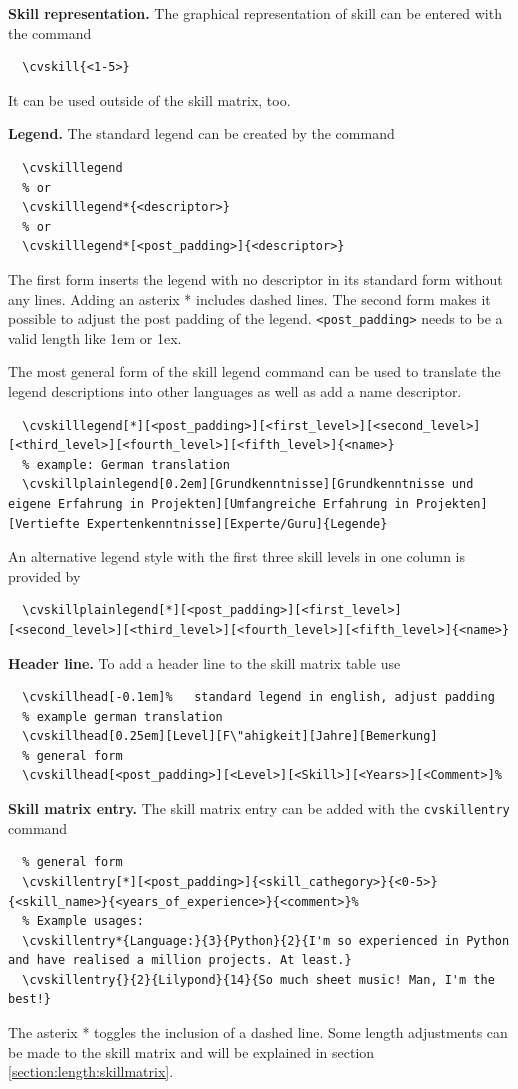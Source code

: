 \documentclass[a4paper,11pt]{article}
\newcommand{\code}[1]{\lstinline!#1!}
\begin{document}
{\bfseries Skill representation. } The graphical representation of skill can be entered with the command
\begin{lstlisting}
  \cvskill{<1-5>}
\end{lstlisting}
It can be used outside of the skill matrix, too. \medskip


{\bfseries Legend. } The standard legend can be created by the command
\begin{lstlisting}
  \cvskilllegend
  % or
  \cvskilllegend*{<descriptor>}
  % or
  \cvskilllegend*[<post_padding>]{<descriptor>}
\end{lstlisting}
The first form inserts the legend with no descriptor in its standard form without any lines.
Adding an asterix * includes dashed lines.
The second form makes it possible to adjust the post padding of the legend. \code{<post_padding>} needs to be a valid length like 1em or 1ex.

The most general form of the skill legend command can be used to translate the legend descriptions into other languages as well as add a name descriptor.

\begin{lstlisting}
  \cvskilllegend[*][<post_padding>][<first_level>][<second_level>][<third_level>][<fourth_level>][<fifth_level>]{<name>}
  % example: German translation
  \cvskillplainlegend[0.2em][Grundkenntnisse][Grundkenntnisse und eigene Erfahrung in Projekten][Umfangreiche Erfahrung in Projekten][Vertiefte Expertenkenntnisse][Experte/Guru]{Legende}
\end{lstlisting}

An alternative legend style with the first three skill levels in one column is provided by
\begin{lstlisting}
  \cvskillplainlegend[*][<post_padding>][<first_level>][<second_level>][<third_level>][<fourth_level>][<fifth_level>]{<name>}
\end{lstlisting} \medskip

{\bfseries Header line. } To add a header line to the skill matrix table use
\begin{lstlisting}
  \cvskillhead[-0.1em]%   standard legend in english, adjust padding
  % example german translation
  \cvskillhead[0.25em][Level][F\"ahigkeit][Jahre][Bemerkung]
  % general form
  \cvskillhead[<post_padding>][<Level>][<Skill>][<Years>][<Comment>]%
\end{lstlisting}

{\bfseries Skill matrix entry. } The skill matrix entry can be added with the \code{cvskillentry} command
\begin{lstlisting}
  % general form
  \cvskillentry[*][<post_padding>]{<skill_cathegory>}{<0-5>}{<skill_name>}{<years_of_experience>}{<comment>}%
  % Example usages:
  \cvskillentry*{Language:}{3}{Python}{2}{I'm so experienced in Python and have realised a million projects. At least.}
  \cvskillentry{}{2}{Lilypond}{14}{So much sheet music! Man, I'm the best!}
\end{lstlisting}
The asterix * toggles the inclusion of a dashed line.
Some length adjustments can be made to the skill matrix and will be explained in section \ref{section:length:skillmatrix}.
\end{document}
